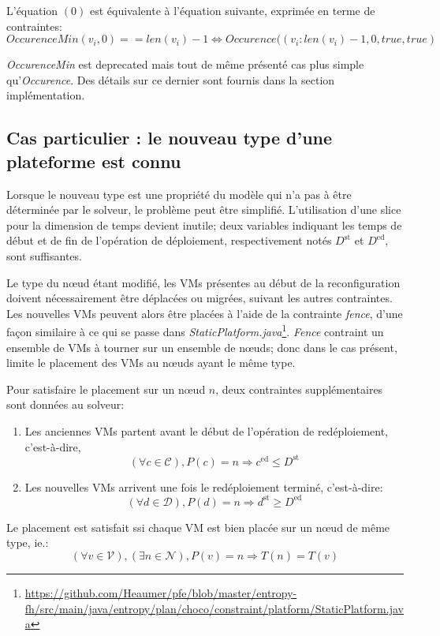 \documentclass[a4paper]{article}
\begin{document}
L'équation $(0)$ est équivalente à l'équation suivante, exprimée en terme
de contraintes:
\[
	OccurenceMin(v_i, 0) == len(v_i)-1
	\Leftrightarrow
	Occurence((v_i:len(v_i)-1, 0, true, true)
\]

\textit{OccurenceMin} est deprecated mais tout de même présenté cas plus
simple qu'\textit{Occurence}. Des détails sur ce dernier sont fournis
dans la section implémentation.

\subsection{Cas particulier : le nouveau type d'une plateforme est connu}
Lorsque le nouveau type est une propriété du modèle qui n'a pas à être
déterminée par le solveur, le problème peut être simplifié. L'utilisation
d'une slice pour la dimension de temps devient inutile; deux variables indiquant
les temps de début et de fin de l'opération de déploiement, respectivement notés $D^\mathrm{st}$ et $D^\mathrm{ed}$, sont suffisantes.

Le type du nœud étant modifié, les VMs présentes au début de la reconfiguration
doivent nécessairement être déplacées ou migrées, suivant les autres
contraintes. Les nouvelles VMs peuvent alors être placées à l'aide de
la contrainte \textit{fence}, d'une façon similaire à ce qui se passe dans
\textit{StaticPlatform.java}\footnote{\url{https://github.com/Heaumer/pfe/blob/master/entropy-fh/src/main/java/entropy/plan/choco/constraint/platform/StaticPlatform.java}}.
\textit{Fence} contraint un ensemble de VMs à tourner sur un
ensemble de nœuds; donc dans le cas présent, limite le placement des VMs
au nœuds ayant le même type.

Pour satisfaire le placement sur un nœud $n$, deux contraintes supplémentaires sont
données au solveur:

\begin{enumerate}
	\item Les anciennes VMs partent avant le début de l'opération de
		redéploiement, c'est-à-dire,
\[
	(\forall c \in \mathcal C), P(c) = n \Rightarrow c^\mathrm{ed} \leq D^\mathrm{st}
\]
	\item Les nouvelles VMs arrivent une fois le redéploiement terminé,
		c'est-à-dire:
\[
	(\forall d \in \mathcal D), P(d) = n \Rightarrow d^\mathrm{st} \geq D^\mathrm{ed}
\]
\end{enumerate}
Le placement est satisfait ssi chaque VM est bien placée sur
un nœud de même type, ie.:
\[
	(\forall v \in \mathcal V), (\exists n \in \mathcal N), P(v) = n
		\Rightarrow T(n) = T(v)	
\]
\end{document}
